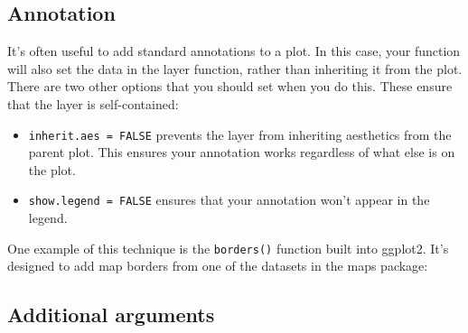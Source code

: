 \subsection{Annotation}

It's often useful to add standard annotations to a plot. In this case,
your function will also set the data in the layer function, rather than
inheriting it from the plot. There are two other options that you should
set when you do this. These ensure that the layer is self-contained:

\begin{itemize}
\item
  \texttt{inherit.aes\ =\ FALSE} prevents the layer from inheriting
  aesthetics from the parent plot. This ensures your annotation works
  regardless of what else is on the plot. 
\item
  \texttt{show.legend\ =\ FALSE} ensures that your annotation won't
  appear in the legend. 
\end{itemize}

One example of this technique is the \texttt{borders()} function built
into ggplot2. It's designed to add map borders from one of the datasets
in the maps package: 

\begin{Shaded}
\begin{Highlighting}[]
\StringTok{ } \NormalTok{, } \NormalTok{, } \NormalTok{, }
                     
  \StringTok{ }
  \NormalTok{(}
     
       
     \NormalTok{, } 
  \NormalTok{)}
\NormalTok{\}}
\end{Highlighting}
\end{Shaded}

\subsection{Additional arguments}


